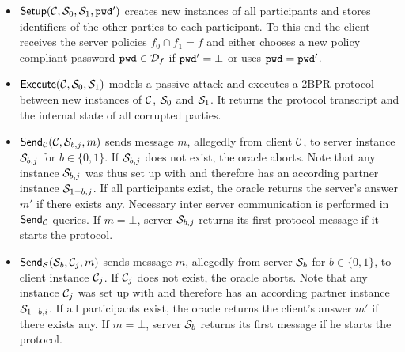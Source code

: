 \begin{itemize}
  \item $\mathsf{Setup}(\mathcal{C},\mathcal{S}_0,\mathcal{S}_1, \mathtt{pwd}')$ creates new instances of all participants and stores identifiers of the other parties to each participant.
        To this end the client receives the server policies $f_0\cap f_1=f$ and either chooses a new policy compliant password $\mathtt{pwd}\in\mathcal{D}_f$ if $\mathtt{pwd}'=\bot$ or uses $\mathtt{pwd}=\mathtt{pwd}'$.

  \item $\mathsf{Execute}(\mathcal{C},\mathcal{S}_0,\mathcal{S}_1)$ models a passive attack and executes a \ac{2BPR} protocol between new instances of $\mathcal{C}$, $\mathcal{S}_0$ and $\mathcal{S}_1$. %
        It returns the protocol transcript and the internal state of all corrupted parties.

  \item $\mathsf{Send}_\mathcal{C}(\mathcal{C},\mathcal{S}_{b,j},m)$ sends message $m$, allegedly from client $\mathcal{C}$, to server instance $\mathcal{S}_{b,j}$ for $b\in\{0,1\}$.
        If $\mathcal{S}_{b,j}$ does not exist, the oracle aborts. %
        Note that any instance $\mathcal{S}_{b,j}$ was thus set up with \Setup and therefore has an according partner instance $\mathcal{S}_{1-b,j}$.
        If all participants exist, the oracle returns the server's answer $m'$ if there exists any.
        Necessary inter server communication is performed in $\mathsf{Send}_\mathcal{C}$ queries.
        If $m=\bot$, server $\mathcal{S}_{b,j}$ returns its first protocol message if it starts the protocol.

  \item $\mathsf{Send}_\mathcal{S}(\mathcal{S}_{b},\mathcal{C}_{j},m)$ sends message $m$, allegedly from server $\mathcal{S}_{b}$ for $b\in\{0,1\}$, to client instance $\mathcal{C}_{j}$.
        If $\mathcal{C}_j$ does not exist, the oracle aborts.
        Note that any instance $\mathcal{C}_j$ was set up with \Setup and therefore has an according partner instance $\mathcal{S}_{1-b,i}$.
        If all participants exist, the oracle returns the client's answer $m'$ if there exists any.
        If $m=\bot$, server $\mathcal{S}_{b}$ returns its first message if he starts the protocol.


\end{itemize}

